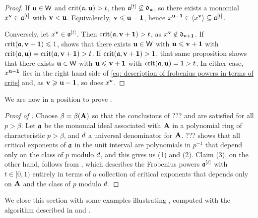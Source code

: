 \documentclass{amsart}
\begin{document}
\begin{proof}
   If $\mathbf{u} \in \mathsf{W}$ and $\operatorname{crit}(\mathfrak{a}, \mathbf{u}) > t$, then $\mathfrak{a}^{[t]}\not\subseteq \mathfrak{d}_{\mathbf{u}}$, so there exists a monomial $x^{\mathbf{v}} \in \mathfrak{a}^{[t]}$ with $\mathbf{v} < \mathbf{u}$.
   Equivalently, $\mathbf{v} \leqslant \mathbf{u}-\mathbf{1}$, hence $x^{\mathbf{u}-\mathbf{1}}\in \langle x^{\mathbf{v}} \rangle\subseteq \mathfrak{a}^{[t]}$.
   
   Conversely, let $x^{\mathbf{v}}\in \mathfrak{a}^{[t]}$.
   Then $\operatorname{crit}(\mathfrak{a},\mathbf{v}+\mathbf{1}) > t$, as $x^{\mathbf{v}}\notin \mathfrak{d}_{\mathbf{v}+\mathbf{1}}$.
   If $\operatorname{crit}(\mathfrak{a}, \mathbf{v}+\mathbf{1}) \leqslant 1$,  shows that there exists $\mathbf{u} \in \mathsf{W}$ with $\mathbf{u} \leqslant \mathbf{v} +\mathbf{1}$ with $\operatorname{crit}(\mathfrak{a},\mathbf{u}) = \operatorname{crit}(\mathfrak{a}, \mathbf{v}+\mathbf{1}) > t$.
   If $\operatorname{crit}(\mathfrak{a}, \mathbf{v}+\mathbf{1}) > 1$, that same proposition shows that there exists $\mathbf{u} \in \mathsf{W}$ with $\mathbf{u} \leqslant \mathbf{v} +\mathbf{1}$ with $\operatorname{crit}(\mathfrak{a},\mathbf{u}) = 1 > t$.
   In either case,  $x^{\mathbf{u}-\mathbf{1}}$ lies in the right hand side of \eqref{eq: description of frobenius powers in terms of crits} and, as $\mathbf{v} \geqslant \mathbf{u} - \mathbf{1}$, so does $x^{\mathbf{v}}$.
\end{proof}

We are now in a position to prove .

\begin{proof}[Proof of ]
   Choose $\beta = \beta(\mathbf{A})$ so that the conclusions of ???  and  are satisfied for all $p>\beta$.
   Let $\mathfrak{a}$ be the monomial ideal associated with $\mathbf{A}$ in a polynomial ring of characteristic $p>\beta$, and $d$ a universal denominator for $\mathbf{A}$.
   ??? shows that all critical exponents of $\mathfrak{a}$ in the unit interval are polynomials in $p^{-1}$ that depend only on the class of $p$ modulo $d$, and this gives us (1) and (2).
   Claim (3), on the other hand, follows from , which describes the Frobenius powers $\mathfrak{a}^{[t]}$ with $t\in [0,1)$ entirely in terms of a collection of critical exponents that depends only on $\mathbf{A}$ and the class of $p$ modulo $d$. 
\end{proof}

We close this section with some examples illustrating , computed with the algorithm described in  and .
\end{document}

